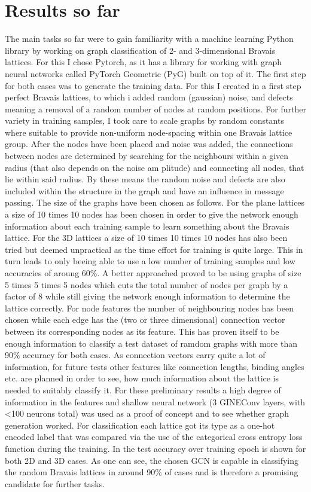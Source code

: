\documentclass[11pt,a4paper]{article}
\begin{document}
\section{Results so far}
\label{sec:Results so far}
The main tasks so far were to gain familiarity with a machine learning Python library by working on graph classification of 2- and 3-dimensional Bravais lattices. 
For this I chose Pytorch, as it has a library for working with graph neural networks called PyTorch Geometric (PyG) built on top of it. 
The first step for both cases was to generate the training data. 
For this I created in a first step perfect Bravais lattices, to which i added random (gaussian) noise, and defects meaning a removal of a random number of nodes at random positions. 
For further variety in training samples, I took care to scale graphs by random constants where suitable to provide non-uniform node-spacing within one Bravais lattice group. 
After the nodes have been placed and noise was added, the connections between nodes are determined by searching for the neighbours within a given radius (that also depends on the noise am plitude) and connecting all nodes, that lie within said radius. 
By these means the random noise and defects are also included within the structure in the graph and have an influence in message passing.
The size of the graphs have been chosen as follows. 
For the plane lattices a size of 10 times 10 nodes has been chosen in order to give the network enough information about each training sample to learn something about the Bravais lattice. 
For the 3D lattices a  size of 10 times 10 times 10 nodes has also been tried but deemed unpractical as the time effort for training is quite large. 
This in turn leads to only beeing able to use a low number of training samples and low accuracies of aroung 60\%. 
A better approached proved to be using graphs of size 5 times 5 times 5 nodes which cuts the total number of nodes per graph by a factor of 8 while still giving the network enough information to determine the lattice correctly. 
For node features the number of neighbouring nodes has been chosen while each edge has the (two or three dimensional) connection vector between its corresponding nodes as its feature. 
This has proven itself to be enough information to classify a test dataset of ramdom graphs with more than 90\% accuracy for both cases. 
As connection vectors carry quite a lot of information, for future tests other features like connection lengths, binding angles etc. are planned in order to see, how much information about the lattice is needed to suitably classify it. 
For these preliminary results a high degree of information in the features and shallow neural network (3 GINEConv layers, with <100 neurons total) was used as a proof of concept and to see whether graph generation worked. 
For classification each lattice got its type as a one-hot encoded label that was compared via the use of the categorical cross entropy loss function during the training. 
In %
the test accuracy over training epoch is shown for both 2D and 3D cases. 
As one can see, the chosen GCN is capable in classifying the random Bravais lattices in around 90\% of cases and is therefore a promising candidate for further tasks. 
\end{document}
